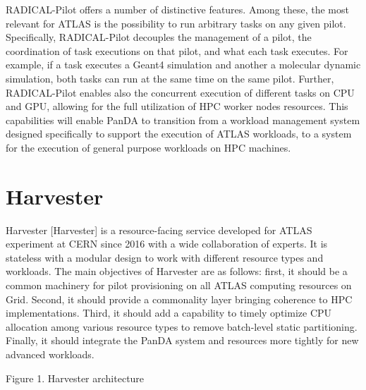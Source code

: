 \documentclass{webofc}
\begin{document}
RADICAL-Pilot offers a number of distinctive features. Among these, the most
relevant for ATLAS is the possibility to run arbitrary tasks on any given
pilot. Specifically, RADICAL-Pilot decouples the management of a pilot, the
coordination of task executions on that pilot, and what each task executes.
For example, if a task executes a Geant4 simulation and another a molecular
dynamic simulation, both tasks can run at the same time on the same pilot.
Further, RADICAL-Pilot enables also the concurrent execution of different
tasks on CPU and GPU, allowing for the full utilization of HPC worker nodes
resources. This capabilities will enable PanDA to transition from a workload
management system designed specifically to support the execution of ATLAS
workloads, to a system for the execution of general purpose workloads on HPC
machines.


\section{Harvester}

Harvester [Harvester] is a resource-facing service developed for ATLAS
experiment at CERN since 2016 with a wide collaboration of experts.  It is
stateless with a modular design to work with different resource types and
workloads. The main objectives of Harvester are as follows: first, it should
be a common machinery for pilot provisioning on all ATLAS computing resources
on Grid. Second, it should provide a commonality layer bringing coherence to
HPC implementations. Third, it should add a capability to timely optimize CPU
allocation among various resource types to remove batch-level static
partitioning. Finally, it should integrate the PanDA system and resources
more tightly for new advanced workloads.

Figure 1. Harvester architecture
\end{document}
